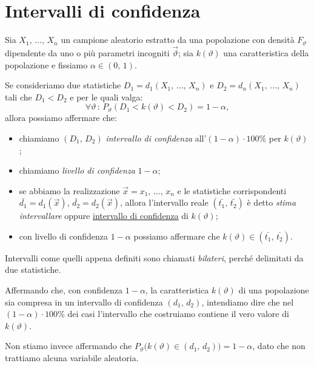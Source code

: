     \section{Intervalli di confidenza}
        \begin{defn}
            Sia $X_1,\, \ldots,\, X_{n}$ un campione aleatorio estratto da una popolazione con densità 
            $F_\vartheta$ dipendente da uno o più parametri incogniti $\vec{\vartheta}$; sia $k(\vartheta)$ 
            una caratteristica della popolazione e fissiamo $\alpha \in (0,\,1)$.

            Se consideriamo due statistiche $D_1 = d_1(X_1,\, \ldots,\, X_{n})$ e 
            $D_2 = d_n(X_1,\, \ldots,\, X_{n})$ tali che $D_1 < D_2$ e per le quali valga: \[
                \forall  \vartheta \,:\, P_\vartheta(D_1 < k(\vartheta) < D_2) = 1-\alpha
            ,\] allora possiamo affermare che:
            \begin{itemize}
                \item chiamiamo $(D_1,\, D_2)$ \emph{intervallo di confidenza} all'$(1-\alpha)\cdot 100\%$ 
                    per $k(\vartheta)$;
                \item chiamiamo \emph{livello di confidenza} $1-\alpha$;
                \item se abbiamo la realizzazione $\vec{x} = x_1,\, \ldots,\, x_{n}$ e le statistiche 
                    corrispondenti $\bar{d_1}=d_1(\vec{x}),\, \bar{d_2}=d_2(\vec{x})$, allora l'intervallo 
                    reale $(\bar{t_1},\, \bar{t_2})$ è detto \emph{stima intervallare} oppure 
                    \underline{intervallo di confidenza} di $k(\vartheta)$;
                \item con livello di confidenza $1-\alpha$ possiamo affermare che 
                    $k(\vartheta) \in (\bar{t_1},\, \bar{t_2})$.
            \end{itemize}
            Intervalli come quelli appena definiti sono chiamati \emph{bilateri}, perché delimitati da 
            due statistiche.
        \end{defn}
        \begin{note}
            Affermando che, con confidenza $1-\alpha$, la caratteristica $k(\vartheta)$ di una popolazione sia 
            compresa in un intervallo di confidenza $(d_1,\, d_2)$, intendiamo dire che nel 
            $(1-\alpha)\cdot 100\%$ dei casi l'intervallo che costruiamo contiene il vero valore di 
            $k(\vartheta)$.

            Non stiamo invece affermando che $P_\vartheta\big(k(\vartheta) \in (d_1,\, d_2)\big) = 1-\alpha$, 
            dato che non trattiamo alcuna variabile aleatoria.
        \end{note}
